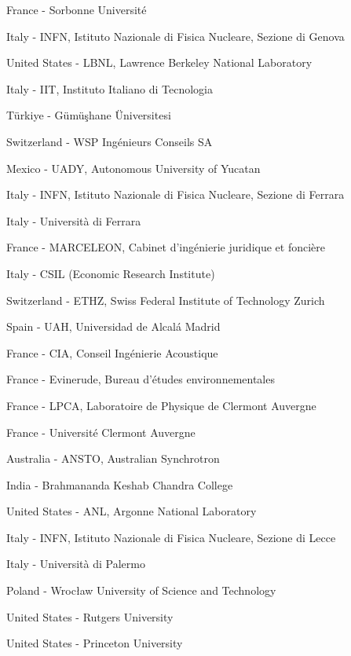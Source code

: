 \item[$^{142}$] France - Sorbonne Universit{\'e}
\item[$^{143}$] Italy - INFN, Istituto Nazionale di Fisica Nucleare, Sezione di Genova
\item[$^{144}$] United States - LBNL, Lawrence Berkeley National Laboratory
\item[$^{145}$] Italy - IIT, Instituto Italiano di Tecnologia
\item[$^{146}$] T{\"u}rkiye - G{\"u}m{\"u}{\c s}hane {\"U}niversitesi
\item[$^{147}$] Switzerland - WSP Ing{\'e}nieurs Conseils SA
\item[$^{148}$] Mexico - UADY, Autonomous University of Yucatan
\item[$^{149}$] Italy - INFN, Istituto Nazionale di Fisica Nucleare, Sezione di Ferrara
\item[$^{150}$] Italy - Universit{\`a} di Ferrara
\item[$^{151}$] France - MARCELEON, Cabinet d'ing{\'e}nierie juridique et fonci{\`e}re
\item[$^{152}$] Italy - CSIL (Economic Research Institute)
\item[$^{153}$] Switzerland - ETHZ, Swiss Federal Institute of Technology Zurich
\item[$^{154}$] Spain - UAH, Universidad de Alcal\'a Madrid
\item[$^{155}$] France - CIA, Conseil Ing{\'e}nierie Acoustique
\item[$^{156}$] France - Evinerude, Bureau d'{\'e}tudes environnementales
\item[$^{157}$] France - LPCA, Laboratoire de Physique de Clermont Auvergne
\item[$^{158}$] France - Universit{\'e} Clermont Auvergne
\item[$^{159}$] Australia - ANSTO, Australian Synchrotron
\item[$^{160}$] India - Brahmananda Keshab Chandra College
\item[$^{161}$] United States - ANL, Argonne National Laboratory
\item[$^{162}$] Italy - INFN, Istituto Nazionale di Fisica Nucleare, Sezione di Lecce
\item[$^{163}$] Italy - Universit{\`a} di Palermo
\item[$^{164}$] Poland - Wroc{\l}aw University of Science and Technology
\item[$^{165}$] United States - Rutgers University
\item[$^{166}$] United States - Princeton University
